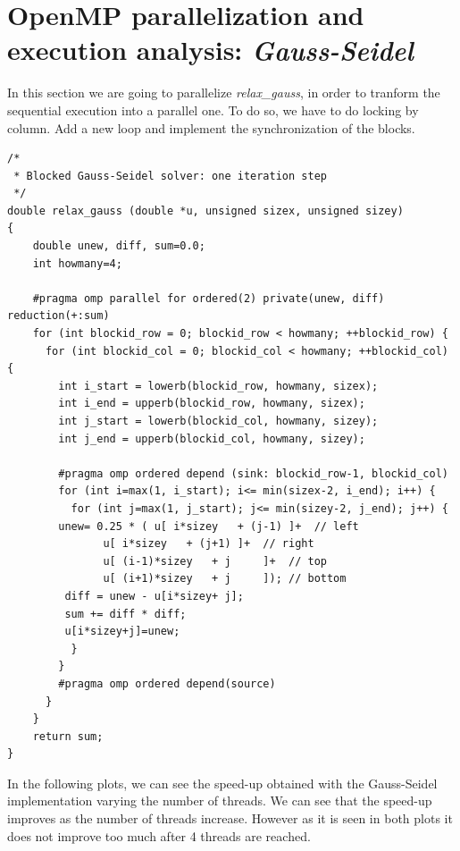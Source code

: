 \documentclass[12]{article}
\begin{document}
\section{OpenMP parallelization and execution analysis: \textit{Gauss-Seidel}}
In this section we are going to parallelize \textit{relax\_gauss}, in order to tranform the sequential execution into a parallel one. To do so, we have to do locking by column. Add a new loop and implement the synchronization of the blocks.
\medskip


\begin{lstlisting}[frame=single]
/*
 * Blocked Gauss-Seidel solver: one iteration step
 */
double relax_gauss (double *u, unsigned sizex, unsigned sizey)
{
    double unew, diff, sum=0.0;
    int howmany=4;

    #pragma omp parallel for ordered(2) private(unew, diff) reduction(+:sum)
    for (int blockid_row = 0; blockid_row < howmany; ++blockid_row) {
      for (int blockid_col = 0; blockid_col < howmany; ++blockid_col) {
        int i_start = lowerb(blockid_row, howmany, sizex);
        int i_end = upperb(blockid_row, howmany, sizex);
        int j_start = lowerb(blockid_col, howmany, sizey);
        int j_end = upperb(blockid_col, howmany, sizey);

        #pragma omp ordered depend (sink: blockid_row-1, blockid_col)
        for (int i=max(1, i_start); i<= min(sizex-2, i_end); i++) {
          for (int j=max(1, j_start); j<= min(sizey-2, j_end); j++) {
	    unew= 0.25 * ( u[ i*sizey	+ (j-1) ]+  // left
			   u[ i*sizey	+ (j+1) ]+  // right
			   u[ (i-1)*sizey	+ j     ]+  // top
			   u[ (i+1)*sizey	+ j     ]); // bottom
	     diff = unew - u[i*sizey+ j];
	     sum += diff * diff; 
	     u[i*sizey+j]=unew;
          }
        }
        #pragma omp ordered depend(source)
      }
    }
    return sum;
}

\end{lstlisting}

In the following plots, we can see the speed-up obtained with the Gauss-Seidel implementation varying the number of threads. We can see that the speed-up improves as the number of threads increase. However as it is seen in both plots it does not improve too much after 4 threads are reached. 
\end{document}

